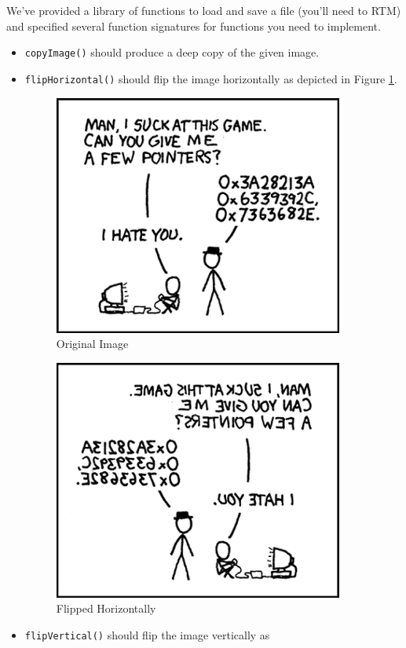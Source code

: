 \documentclass[12pt]{scrartcl}
\begin{document}
We've provided a library of functions to load and save a file (you'll need to 
RTM) and specified several function signatures for functions you need to
implement.  
\begin{itemize}
  \item \texttt{copyImage()} should produce a deep copy of the given
  image.
  \item \texttt{flipHorizontal()} should flip the image horizontally
  as depicted in Figure \ref{image:pointersHFlip}.
  
  \begin{figure}[h]  
  \centering
  \includegraphics[scale=.50]{hack7.0-files/pointers.png}
  \caption{Original Image}
  \end{figure}
  \begin{figure}[h]  
  \centering
  \includegraphics[scale=.50]{hack7.0-files/pointersHFlip}
  \caption{Flipped Horizontally}
  \label{image:pointersHFlip}
  \end{figure}
  \item \texttt{flipVertical()} should flip the image vertically as

\end{itemize}
\end{document}
